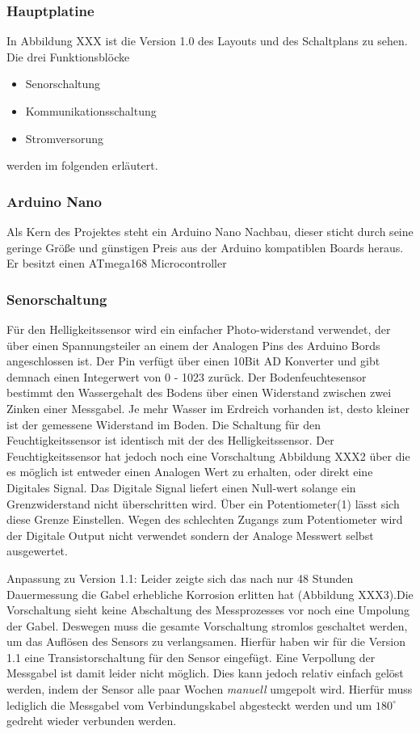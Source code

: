 \documentclass[]{IEEEtran}
\begin{document}
	\subsubsection{Hauptplatine}
	In Abbildung XXX ist die Version 1.0 des Layouts und des Schaltplans zu sehen. Die drei Funktionsblöcke
		\begin{itemize}
			\item Senorschaltung
			\item Kommunikationsschaltung
			\item Stromversorung
		\end{itemize}
	werden im folgenden erläutert. 
	
	\subsubsection{Arduino Nano}
	Als Kern des Projektes steht ein Arduino Nano Nachbau, dieser sticht durch seine geringe Größe und günstigen Preis aus der Arduino kompatiblen Boards heraus. 
	Er besitzt einen ATmega168 Microcontroller
		
	\subsubsection{Senorschaltung} \label{sensorik}
	Für den Helligkeitssensor wird ein einfacher Photo-widerstand verwendet, der über einen Spannungsteiler an einem der Analogen Pins des Arduino Bords angeschlossen ist. Der Pin verfügt über einen 10Bit AD Konverter und gibt demnach einen Integerwert von 0 - 1023 zurück. 
	Der Bodenfeuchtesensor bestimmt den Wassergehalt des Bodens über einen Widerstand zwischen zwei Zinken einer Messgabel. Je mehr Wasser im Erdreich vorhanden ist, desto kleiner ist der gemessene Widerstand im Boden. Die Schaltung für den Feuchtigkeitssensor ist identisch mit der des Helligkeitssensor. Der Feuchtigkeitssensor hat jedoch noch eine Vorschaltung Abbildung XXX2 über die es möglich ist entweder einen Analogen Wert zu erhalten, oder direkt eine Digitales Signal. Das Digitale Signal liefert einen Null-wert solange ein Grenzwiderstand nicht überschritten wird. Über ein  Potentiometer(1) lässt sich diese Grenze Einstellen. Wegen des schlechten Zugangs zum Potentiometer wird der Digitale Output nicht verwendet sondern der Analoge Messwert selbst ausgewertet.
	
	Anpassung zu Version 1.1:
	Leider zeigte sich das nach nur 48 Stunden Dauermessung die Gabel erhebliche Korrosion erlitten hat (Abbildung XXX3).Die Vorschaltung sieht keine Abschaltung des Messprozesses vor noch eine Umpolung der Gabel. Deswegen muss die gesamte Vorschaltung stromlos geschaltet werden, um das Auflösen des Sensors zu verlangsamen. Hierfür haben wir für die Version 1.1 eine Transistorschaltung für den Sensor eingefügt. Eine Verpollung der Messgabel ist damit leider nicht möglich. Dies kann jedoch relativ einfach gelöst werden, indem der Sensor alle paar Wochen \emph{manuell} umgepolt wird. Hierfür muss lediglich die Messgabel vom Verbindungskabel abgesteckt werden und um 
	\begin{math}180^{\circ}\end{math} gedreht wieder verbunden werden. 
	
\end{document}
